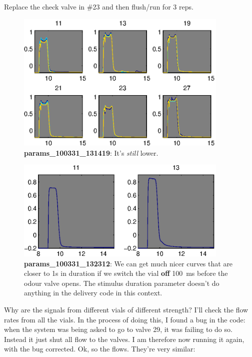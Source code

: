 \documentclass[a4paper]{report}
\begin{document}
Replace the check valve in \#23 and then flush/run for 3 reps. 
\begin{figure}[h]
\centering
\includegraphics[width=4in]{params_100331_131419.eps}
\caption{\textbf{params\_100331\_131419}: It's \textit{still} lower.}
\end{figure}


\begin{figure}[h]
\centering
\includegraphics[width=4in]{params_100331_132312.eps}
\caption{\textbf{params\_100331\_132312}: We can get much nicer curves that are closer to 1s in duration if we
switch the vial \textbf{off} 100~ms before the odour valve opens. The
stimulus duration parameter doesn't do anything in the delivery code
in this context. }
\end{figure}

Why are the signals from different vials of different strength?
I'll check the flow rates from all the vials. In the process of doing
this, I found a bug in the code: when the system was being asked to go
to valve 29, it was failing to do so. Instead it just shut all flow to
the valves. I am therefore now running it again, with the bug
corrected. Ok, so the flows. They're very similar:
\end{document}
